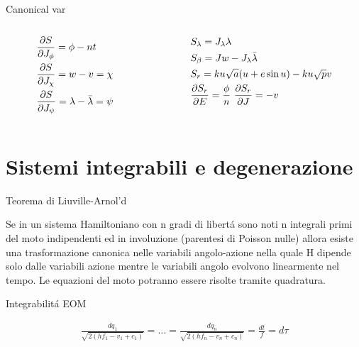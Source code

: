 \begin{wordonframe}{Canonical var}

\begin{columns} \begin{column}{0.5\textwidth}

\begin{align*}
&\PDy{J_{\phi}}{S}=\phi-nt\\
&\PDy{J_{\chi}}{S}=w-v=\chi\\
&\PDy{J_{\psi}}{S}=\lambda-\bar{\lambda}=\psi
\end{align*}

\end{column} \begin{column}{0.5\textwidth}

\begin{align*}
&S_{\lambda}=J_{\lambda}\lambda\\
&S_{\beta}=Jw-J_{\lambda}\bar{\lambda}\\
&S_r=ku\sqrt{a}(u+e\sin{u})-ku\sqrt{p}v\\
&\PDy{E}{S_r}=\frac{\phi}{n} \ \PDy{J}{S_r}=-v
\end{align*}

\end{column} \end{columns}


\end{wordonframe}


\section{Sistemi integrabili e degenerazione}

\begin{frame}{Teorema di Liuville-Arnol'd}

Se in un sistema Hamiltoniano con n gradi di libert\'a sono noti n integrali primi del moto indipendenti ed in involuzione (parentesi di Poisson nulle) allora esiste una trasformazione canonica nelle variabili angolo-azione nella quale H dipende solo dalle variabili azione mentre le variabili angolo evolvono linearmente nel tempo. Le equazioni del moto potranno essere risolte tramite quadratura.


\end{frame}

\begin{wordonframe}{Integrabilit\'a EOM}

\begin{align*}
\frac{dq_1}{\sqrt{2(hf_1-v_1+c_1)}}=\ldots=\frac{dq_n}{\sqrt{2(hf_n-v_n+c_n)}}=\frac{dt}{f}=d\tau
\end{align*}

\end{wordonframe}

